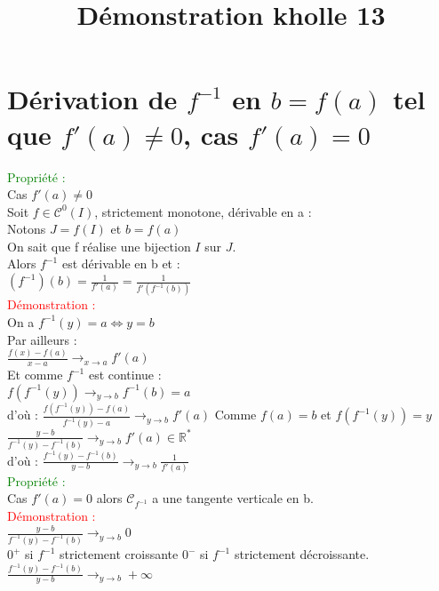 \documentclass{article}
\begin{document}
\title{Démonstration kholle 13}
\date{}
\maketitle
	\renewcommand{\thesection}{\Roman{section}}
	\setlength{\parindent}{1.5cm}
\section{Dérivation de $f^{-1}$ en $b=f(a)$ tel que $f'(a) \neq 0$, cas $f'(a)=0$}
\textcolor{green}{Propriété :} \\
 Cas $f'(a)\neq 0$ \\
Soit $f \in \mathcal{C}^0(I)$, strictement monotone, dérivable en a : \\
Notons $J=f(I)$ et $b=f(a)$ \\ 
On sait que f réalise une bijection $I$ sur $J$. \\ 
Alors $f^{-1}$ est dérivable en b et : \\
$(f^{-1})(b)=\frac{1}{f'(a)}= \frac{1}{f'(f^{-1}(b))}$ \\ 
\textcolor{red}{Démonstration :} \\ 
On a $f^{-1}(y)=a \Leftrightarrow y=b$ \\ 
Par ailleurs : \\ 
$\frac{f(x)-f(a)}{x-a} \rightarrow_{x \rightarrow a} f'(a)$ \\ 
Et comme $f^{-1}$ est continue : \\ 
$f(f^{-1}(y)) \rightarrow_{y \rightarrow b}f^{-1}(b)=a$ \\ 
d'où : $\frac{f(f^{-1}(y))-f(a)}{f^{-1}(y)-a} \rightarrow _{y \rightarrow b} f'(a)$
Comme $f(a)=b$ et $f(f^{-1}(y))=y$ \\ 
$\frac{y-b}{f^{-1}(y)-f^{-1}(b)} \rightarrow_{y \rightarrow b} f'(a) \in \mathbb{R}^*$ \\
d'où : $\frac{f^{-1}(y)-f^{-1}(b)}{y-b} \rightarrow_{y \rightarrow b} \frac{1}{f'(a)}$ \\ 
\textcolor{green}{Propriété :} \\ 
Cas $f'(a)=0$ alors $\mathcal{C}_{f^{-1}}$ a une tangente verticale en b. \\ 
\textcolor{red}{Démonstration :} \\ 
$\frac{y-b}{f^{-1}(y)-f^{-1}(b)} \rightarrow_{y \rightarrow b} 0 $ \\ 
$0^+$ si $f^{-1}$ strictement croissante $0^-$ si $f^{-1}$ strictement décroissante. \\ 
$\frac{f^{-1}(y)-f^{-1}(b)}{y-b} \rightarrow_{y \rightarrow b} + \infty$
\end{document}
